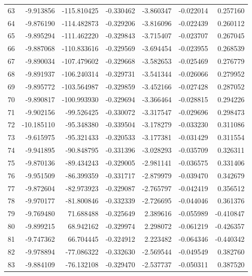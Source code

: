 \begin{tabular}{rrrrrrr}
 63 &  -9.913856 & -115.810425 & -0.330462 &  -3.860347 &  -0.022014 &  0.257160 \\
 64 &  -9.876190 & -114.482873 & -0.329206 &  -3.816096 &  -0.022439 &  0.260112 \\
 65 &  -9.895294 & -111.462220 & -0.329843 &  -3.715407 &  -0.023707 &  0.267045 \\
 66 &  -9.887068 & -110.833616 & -0.329569 &  -3.694454 &  -0.023955 &  0.268539 \\
 67 &  -9.890034 & -107.479602 & -0.329668 &  -3.582653 &  -0.025469 &  0.276779 \\
 68 &  -9.891937 & -106.240314 & -0.329731 &  -3.541344 &  -0.026066 &  0.279952 \\
 69 &  -9.895772 & -103.564987 & -0.329859 &  -3.452166 &  -0.027428 &  0.287052 \\
 70 &  -9.890817 & -100.993930 & -0.329694 &  -3.366464 &  -0.028815 &  0.294226 \\
 71 &  -9.902156 &  -99.526425 & -0.330072 &  -3.317547 &  -0.029696 &  0.298473 \\
 72 & -10.185110 &  -95.348380 & -0.339504 &  -3.178279 &  -0.033230 &  0.311086 \\
 73 &  -9.615975 &  -95.321433 & -0.320533 &  -3.177381 &  -0.031429 &  0.311554 \\
 74 &  -9.941895 &  -90.848795 & -0.331396 &  -3.028293 &  -0.035709 &  0.326311 \\
 75 &  -9.870136 &  -89.434243 & -0.329005 &  -2.981141 &  -0.036575 &  0.331406 \\
 76 &  -9.951509 &  -86.399359 & -0.331717 &  -2.879979 &  -0.039470 &  0.342679 \\
 77 &  -9.872604 &  -82.973923 & -0.329087 &  -2.765797 &  -0.042419 &  0.356512 \\
 78 &  -9.970177 &  -81.800846 & -0.332339 &  -2.726695 &  -0.044046 &  0.361376 \\
 79 &  -9.769480 &   71.688488 & -0.325649 &   2.389616 &  -0.055989 & -0.410847 \\
 80 &  -9.899215 &   68.942162 & -0.329974 &   2.298072 &  -0.061219 & -0.426357 \\
 81 &  -9.747362 &   66.704445 & -0.324912 &   2.223482 &  -0.064346 & -0.440342 \\
 82 &  -9.978894 &  -77.086322 & -0.332630 &  -2.569544 &  -0.049549 &  0.382760 \\
 83 &  -9.884109 &  -76.132108 & -0.329470 &  -2.537737 &  -0.050311 &  0.387520 \\

\end{tabular}
